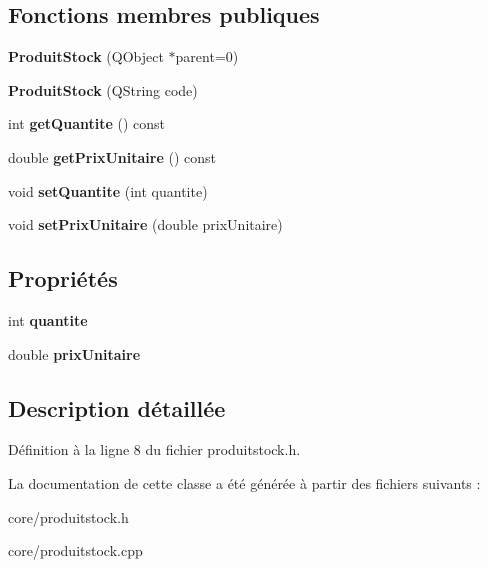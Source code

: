 \subsection*{Fonctions membres publiques}
\begin{DoxyCompactItemize}
\item 
\hypertarget{class_core_1_1_produit_stock_a08ab8dd30ad1be969c9188e2195346fc}{
{\bfseries ProduitStock} (QObject $\ast$parent=0)}
\label{d6/d92/class_core_1_1_produit_stock_a08ab8dd30ad1be969c9188e2195346fc}

\item 
\hypertarget{class_core_1_1_produit_stock_a5f04709d621122123c9117d825a94283}{
{\bfseries ProduitStock} (QString code)}
\label{d6/d92/class_core_1_1_produit_stock_a5f04709d621122123c9117d825a94283}

\item 
\hypertarget{class_core_1_1_produit_stock_a5f4b935a17a0b0435b8c34ae5760abfd}{
int {\bfseries getQuantite} () const }
\label{d6/d92/class_core_1_1_produit_stock_a5f4b935a17a0b0435b8c34ae5760abfd}

\item 
\hypertarget{class_core_1_1_produit_stock_a16263756453a8edffa89cb67eb80b575}{
double {\bfseries getPrixUnitaire} () const }
\label{d6/d92/class_core_1_1_produit_stock_a16263756453a8edffa89cb67eb80b575}

\item 
\hypertarget{class_core_1_1_produit_stock_aa7d1dbc31ea1bf622493cf98f7f06592}{
void {\bfseries setQuantite} (int quantite)}
\label{d6/d92/class_core_1_1_produit_stock_aa7d1dbc31ea1bf622493cf98f7f06592}

\item 
\hypertarget{class_core_1_1_produit_stock_a4110dd03fd5622936a6ac1c281aa157a}{
void {\bfseries setPrixUnitaire} (double prixUnitaire)}
\label{d6/d92/class_core_1_1_produit_stock_a4110dd03fd5622936a6ac1c281aa157a}

\end{DoxyCompactItemize}
\subsection*{Propriétés}
\begin{DoxyCompactItemize}
\item 
\hypertarget{class_core_1_1_produit_stock_a13e71c5d6ab069975dc3452a4359d08e}{
int {\bfseries quantite}}
\label{d6/d92/class_core_1_1_produit_stock_a13e71c5d6ab069975dc3452a4359d08e}

\item 
\hypertarget{class_core_1_1_produit_stock_aea5b4f63bd0bdb3f4add70bad70fc889}{
double {\bfseries prixUnitaire}}
\label{d6/d92/class_core_1_1_produit_stock_aea5b4f63bd0bdb3f4add70bad70fc889}

\end{DoxyCompactItemize}


\subsection{Description détaillée}


Définition à la ligne 8 du fichier produitstock.h.



La documentation de cette classe a été générée à partir des fichiers suivants :\begin{DoxyCompactItemize}
\item 
core/produitstock.h\item 
core/produitstock.cpp\end{DoxyCompactItemize}

